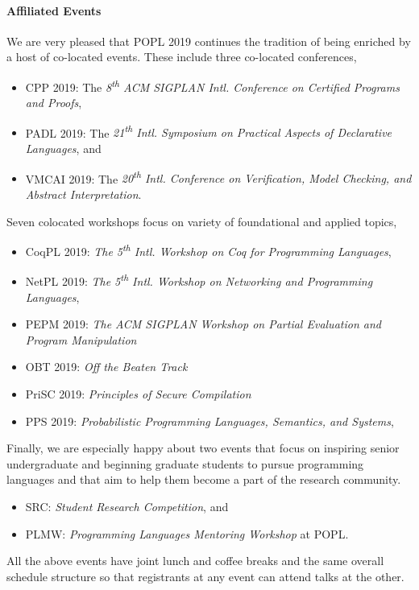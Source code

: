 \paragraph{Affiliated Events}
%
We are very pleased that POPL 2019 continues the tradition of being enriched
by a host of co-located events.
%
These include three co-located conferences,
%
\begin{itemize}
  \item CPP 2019:   The \emph{8\textsuperscript{th} ACM SIGPLAN Intl. Conference on Certified Programs and Proofs},
  \item PADL 2019:  The \emph{21\textsuperscript{th} Intl. Symposium on Practical Aspects of Declarative Languages}, and
  \item VMCAI 2019: The \emph{20\textsuperscript{th} Intl. Conference on Verification, Model Checking, and Abstract Interpretation}.
\end{itemize}
%
Seven colocated workshops focus on variety of foundational and applied topics,
%
\begin{itemize}
  \item CoqPL 2019: \emph{The 5\textsuperscript{th} Intl. Workshop on Coq for Programming Languages},
  \item NetPL 2019: \emph{The 5\textsuperscript{th} Intl. Workshop on Networking and Programming Languages},
  \item PEPM 2019:  \emph{The ACM SIGPLAN Workshop on Partial Evaluation and Program Manipulation}
  \item OBT 2019:   \emph{Off the Beaten Track}
  \item PriSC 2019: \emph{Principles of Secure Compilation}
  \item PPS 2019:   \emph{Probabilistic Programming Languages, Semantics, and Systems},
\end{itemize}
%
Finally, we are especially happy about two events that
focus on inspiring senior undergraduate and beginning
graduate students to pursue programming languages and
that aim to help them become a part of the research
community.
%
\begin{itemize}
\item SRC: \emph{Student Research Competition}, and
\item PLMW: \emph{Programming Languages Mentoring Workshop} at POPL.
\end{itemize}
%
All the above events have joint lunch and coffee breaks
and the same overall schedule structure so that registrants
at any event can attend talks at the other.

